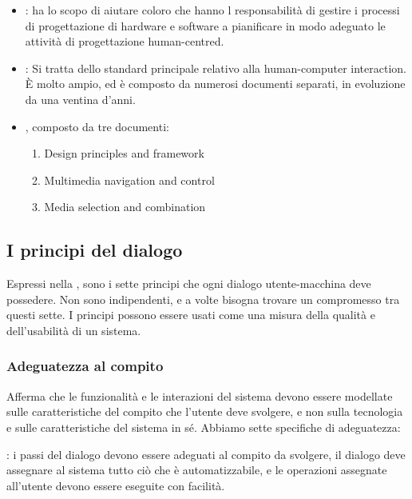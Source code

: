 \begin{itemize}
    \item {}: ha lo scopo di aiutare coloro che hanno l responsabilità di gestire i processi di progettazione di hardware e software a pianificare in modo adeguato le attività di progettazione human-centred.
    \item {}: Si tratta dello standard principale relativo alla human-computer interaction. È molto ampio, ed è composto da numerosi documenti separati, in evoluzione da una ventina d’anni.
    \item {}, composto da tre documenti:
          \begin{enumerate}
              \item Design principles and framework
              \item Multimedia navigation and control
              \item Media selection and combination
          \end{enumerate}
\end{itemize}

\subsection{I principi del dialogo}

Espressi nella , sono i sette principi che ogni dialogo utente-macchina deve possedere. Non sono indipendenti, e a volte bisogna trovare un compromesso tra questi sette. I principi possono essere usati come una misura della qualità e dell'usabilità di un sistema.

\subsubsection{Adeguatezza al compito}

Afferma che le funzionalità e le interazioni del sistema devono essere modellate sulle caratteristiche del compito che l'utente deve svolgere, e non sulla tecnologia e sulle caratteristiche del sistema in sé. Abbiamo sette specifiche di adeguatezza:

: i passi del dialogo devono essere adeguati al compito da svolgere, il dialogo deve assegnare al sistema tutto ciò che è automatizzabile, e le operazioni assegnate all'utente devono essere eseguite con facilità.

